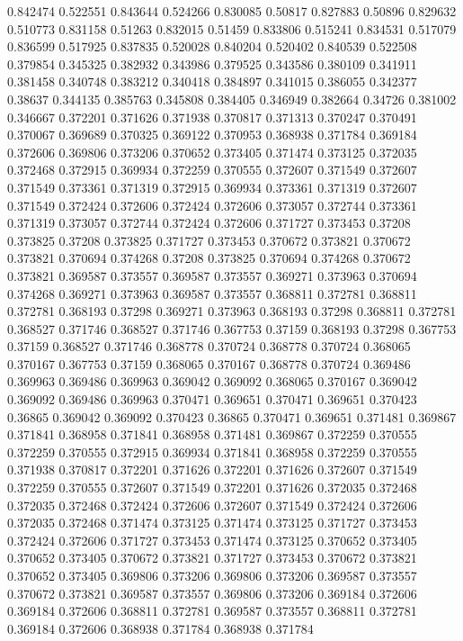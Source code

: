 0.842474 0.522551
0.843644 0.524266
0.830085 0.50817
0.827883 0.50896
0.829632 0.510773
0.831158 0.51263
0.832015 0.51459
0.833806 0.515241
0.834531 0.517079
0.836599 0.517925
0.837835 0.520028
0.840204 0.520402
0.840539 0.522508
0.379854 0.345325
0.382932 0.343986
0.379525 0.343586
0.380109 0.341911
0.381458 0.340748
0.383212 0.340418
0.384897 0.341015
0.386055 0.342377
0.38637 0.344135
0.385763 0.345808
0.384405 0.346949
0.382664 0.34726
0.381002 0.346667
0.372201 0.371626
0.371938 0.370817
0.371313 0.370247
0.370491 0.370067
0.369689 0.370325
0.369122 0.370953
0.368938 0.371784
0.369184 0.372606
0.369806 0.373206
0.370652 0.373405
0.371474 0.373125
0.372035 0.372468
0.372915 0.369934
0.372259 0.370555
0.372607 0.371549
0.372607 0.371549
0.373361 0.371319
0.372915 0.369934
0.373361 0.371319
0.372607 0.371549
0.372424 0.372606
0.372424 0.372606
0.373057 0.372744
0.373361 0.371319
0.373057 0.372744
0.372424 0.372606
0.371727 0.373453
0.37208 0.373825
0.37208 0.373825
0.371727 0.373453
0.370672 0.373821
0.370672 0.373821
0.370694 0.374268
0.37208 0.373825
0.370694 0.374268
0.370672 0.373821
0.369587 0.373557
0.369587 0.373557
0.369271 0.373963
0.370694 0.374268
0.369271 0.373963
0.369587 0.373557
0.368811 0.372781
0.368811 0.372781
0.368193 0.37298
0.369271 0.373963
0.368193 0.37298
0.368811 0.372781
0.368527 0.371746
0.368527 0.371746
0.367753 0.37159
0.368193 0.37298
0.367753 0.37159
0.368527 0.371746
0.368778 0.370724
0.368778 0.370724
0.368065 0.370167
0.367753 0.37159
0.368065 0.370167
0.368778 0.370724
0.369486 0.369963
0.369486 0.369963
0.369042 0.369092
0.368065 0.370167
0.369042 0.369092
0.369486 0.369963
0.370471 0.369651
0.370471 0.369651
0.370423 0.36865
0.369042 0.369092
0.370423 0.36865
0.370471 0.369651
0.371481 0.369867
0.371841 0.368958
0.371841 0.368958
0.371481 0.369867
0.372259 0.370555
0.372259 0.370555
0.372915 0.369934
0.371841 0.368958
0.372259 0.370555
0.371938 0.370817
0.372201 0.371626
0.372201 0.371626
0.372607 0.371549
0.372259 0.370555
0.372607 0.371549
0.372201 0.371626
0.372035 0.372468
0.372035 0.372468
0.372424 0.372606
0.372607 0.371549
0.372424 0.372606
0.372035 0.372468
0.371474 0.373125
0.371474 0.373125
0.371727 0.373453
0.372424 0.372606
0.371727 0.373453
0.371474 0.373125
0.370652 0.373405
0.370652 0.373405
0.370672 0.373821
0.371727 0.373453
0.370672 0.373821
0.370652 0.373405
0.369806 0.373206
0.369806 0.373206
0.369587 0.373557
0.370672 0.373821
0.369587 0.373557
0.369806 0.373206
0.369184 0.372606
0.369184 0.372606
0.368811 0.372781
0.369587 0.373557
0.368811 0.372781
0.369184 0.372606
0.368938 0.371784
0.368938 0.371784

